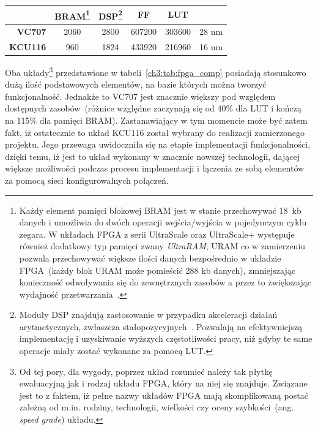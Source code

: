 \begin{enumerate}
\begin{savenotes}
\begin{table}[H]
\begin{tabular}{|r|c|c|c|c|c|}
                  & BRAM\footnote{Każdy element pamięci blokowej BRAM jest w stanie przechowywać 18~kb danych i umożliwia do dwóch operacji wejścia/wyjścia w pojedynczym cyklu zegara. W układach FPGA z serii UltraScale oraz UltraScale+ występuje również dodatkowy typ pamięci zwany \textit{UltraRAM}, URAM co w zamierzeniu pozwala przechowywać większe ilości danych bezpośrednio w układzie FPGA~(każdy blok URAM może pomieścić 288 kb danych), zmniejszając konieczność odwoływania się do zewnętrznych zasobów a przez to zwiększając wydajność przetwarzania~\cite{UG573}. }      & DSP\footnote{Moduły DSP znajdują zastosowanie w przypadku akceleracji działań arytmetycznych, zwłaszcza stałopozycyjnych~\cite{DSP48E1}\cite{DSP48E2}. Pozwalają na efektywniejszą implementację i uzyskiwanie wyższych częstotliwości pracy, niż gdyby te same operacje miały zostać wykonane za pomocą LUT.}       & FF         & LUT        &                                                                                 \\ \hline
\textbf{VC707}    & 2060      & 2800      & 607200     & 303600     & 28 nm                                                                   \\ \hline
\textbf{KCU116}   & 960       & 1824      & 433920     & 216960     & 16 nm                                                                \\ \hline
\end{tabular}
\end{table}
\end{savenotes}
Oba układy\footnote{Od tej pory, dla wygody, poprzez układ rozumieć należy tak płytkę ewaluacyjną jak i rodzaj układu FPGA, który na niej się znajduje. Związane jest to z faktem, iż pełne nazwy układów FPGA mają skomplikowaną postać zależną od m.in. rodziny, technologii, wielkości czy oceny szybkości~(ang. \textit{speed grade}) układu.} przedstawione w tabeli~\ref{ch3:tab:fpga_comp} posiadają stosunkowo dużą ilość podstawowych elementów, na bazie których można tworzyć funkcjonalność. Jednakże to VC707 jest znacznie większy pod względem dostępnych zasobów~(różnice względne zaczynają się od 40\% dla LUT i kończą na 115\% dla pamięci BRAM). Zastanawiający w tym momencie może być zatem fakt, iż ostatecznie to układ KCU116 został wybrany do realizacji zamierzonego projektu. Jego przewaga uwidoczniła się na etapie implementacji funkcjonalności, dzięki temu, iż jest to układ wykonany w znacznie nowszej technologii, dającej większe możliwości podczas procesu implementacji i łączenia ze sobą elementów za pomocą sieci konfigurowalnych połączeń.

\end{enumerate}
